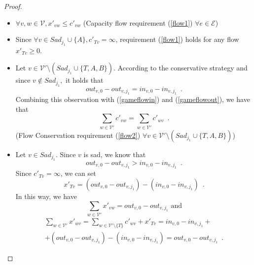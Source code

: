 \documentclass[11pt]{llncs}
\begin{document}
\begin{proof}
\begin{itemize}
          \item $\forall v,w \in \mathcal{V}, x'_{vw} \leq c'_{vw}$ (Capacity flow requirement (\ref{flow1}) $\forall e \in
          \mathcal{E}$)
          \item Since $\forall v \in Sad_{j_1} \cup \{A\}, c'_{Tv} = \infty$, requirement (\ref{flow1}) holds for any flow
          $x'_{Tv} \geq 0$.
          \item Let $v \in \mathcal{V}' \setminus \left(Sad_{j_1} \cup \{T, A, B\}\right)$. According to the conservative
          strategy and since $v \notin Sad_{j_1},$ it holds that
          \begin{equation}
             out_{v, 0} - out_{v, j_1} = in_{v, 0} - in_{v, j_1} \enspace.
          \end{equation}
          Combining this observation with (\ref{gameflowin}) and (\ref{gameflowout}), we have that
          \begin{equation}
             \sum\limits_{w \in \mathcal{V}'}c'_{vw} = \sum\limits_{w \in \mathcal{V}'}c'_{wv} \enspace.
          \end{equation}
          (Flow Conservation requirement (\ref{flow2}) $\forall v \in \mathcal{V}' \setminus \left(Sad_{j_1}
          \cup \{T, A, B\}\right)$)
          \item Let $v \in Sad_{j_1}$. Since $v$ is sad, we know that
          \begin{equation}
             out_{v, 0} - out_{v, j_1} > in_{v, 0} - in_{v, j_1} \enspace.
          \end{equation}
          Since $c'_{Tv} = \infty$, we can set
          \begin{equation}
             x'_{Tv} = \left(out_{v, 0} - out_{v, j_1}\right) - \left(in_{v, 0} - in_{v, j_1}\right) \enspace.
          \end{equation}
          In this way, we have
          \begin{equation}
             \sum\limits_{w \in \mathcal{V}'}x'_{vw} = out_{v, 0} - out_{v, j_1} \mbox{ and}
          \end{equation}
          \begin{equation}
          \begin{gathered}
             \sum\limits_{w \in \mathcal{V}'}x'_{wv} = \sum\limits_{w \in \mathcal{V}' \setminus \{T\}}c'_{wv} + x'_{Tv} =
             in_{v, 0} - in_{v, j_1} + \\ + (out_{v, 0} - out_{v, j_1}) - (in_{v, 0} - in_{v, j_1}) = out_{v, 0} -
             out_{v, j_1} \enspace.

\end{gathered}
\end{equation}
\end{itemize}
\end{proof}
\end{document}

